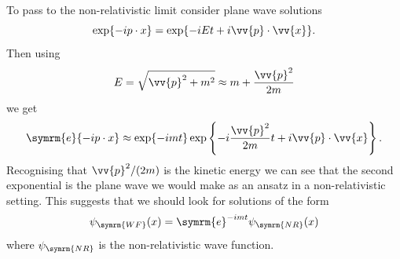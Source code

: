 \documentclass[fleqn]{NotesClass}
\newcommand{\e}{\symrm{e}}
\begin{document}
    To pass to the non-relativistic limit consider plane wave solutions
    \begin{equation}
        \exp\{-ip \cdot x\} = \exp\{-iEt + i\vv{p} \cdot \vv{x}\}.
    \end{equation}
    Then using
    \begin{equation}
        E = \sqrt{\vv{p}^2 + m^2} \approx m + \frac{\vv{p}^2}{2m}
    \end{equation}
    we get
    \begin{equation}
        \e\{-ip\cdot x\} \approx \exp\{-imt\}\exp\left\{ -i\frac{\vv{p}^2}{2m}t + i\vv{p} \cdot \vv{x} \right\}.
    \end{equation}
    Recognising that \(\vv{p}^2/(2m)\) is the kinetic energy we can see that the second exponential is the plane wave we would make as an ansatz in a non-relativistic setting.
    This suggests that we should look for solutions of the form
    \begin{equation}
        \psi_{\symrm{WF}}(x) = \e^{-imt} \psi_{\symrm{NR}}(x)
    \end{equation}
    where \(\psi_{\symrm{NR}}\) is the non-relativistic wave function.
    
\end{document}
